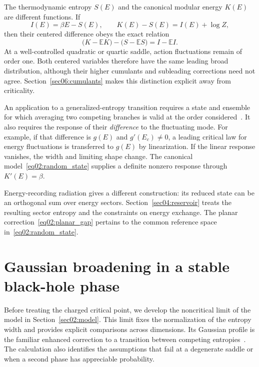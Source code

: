 \documentclass[11pt,letterpaper]{article}
\newcommand{\E}{\mathbb{E}}
\theoremstyle{plain}
\theoremstyle{definition}
\theoremstyle{remark}
\begin{document}
The thermodynamic entropy $S(E)$ and the canonical modular energy $K(E)$ are different functions. If
\begin{equation}
 I(E)=\beta E-S(E),
 \qquad K(E)-S(E)=I(E)+\log Z,
 \label{eq02:action_dictionary}
\end{equation}
then their centered difference obeys the exact relation
\begin{equation}
 \bigl(K-\E K\bigr)-\bigl(S-\E S\bigr)=I-\E I.
 \label{eq02:centered_dictionary}
\end{equation}
At a well-controlled quadratic or quartic saddle, action fluctuations remain of order one. Both centered variables therefore have the same leading broad distribution, although their higher cumulants and subleading corrections need not agree. Section~\ref{sec06:cumulants} makes this distinction explicit away from criticality.

An application to a generalized-entropy transition requires a state and ensemble for which averaging two competing branches is valid at the order considered~\cite{engelhardtwall2015,marolfwangwang2020,dongwang2020}. It also requires the response of their \emph{difference} to the fluctuating mode. For example, if that difference is $g(E)$ and $g'(E_c)\neq0$, a leading critical law for energy fluctuations is transferred to $g(E)$ by linearization. If the linear response vanishes, the width and limiting shape change. The canonical model~\eqref{eq02:random_state} supplies a definite nonzero response through $K'(E)=\beta$.

Energy-recording radiation gives a different construction: its reduced state can be an orthogonal sum over energy sectors. Section~\ref{sec04:reservoir} treats the resulting sector entropy and the constraints on energy exchange. The planar correction~\eqref{eq02:planar_gap} pertains to the common reference space in~\eqref{eq02:random_state}.

\section{Gaussian broadening in a stable black-hole phase}
\label{sec10:regular}

Before treating the charged critical point, we develop the noncritical limit of the model in Section~\ref{sec02:model}. This limit fixes the normalization of the entropy width and provides explicit comparisons across dimensions. Its Gaussian profile is the familiar enhanced correction to a transition between competing entropies~\cite{murthysrednicki2019,marolfwangwang2020,dongwang2020}. The calculation also identifies the assumptions that fail at a degenerate saddle or when a second phase has appreciable probability.
\end{document}
